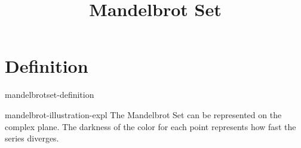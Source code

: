 \documentclass[preview]{standalone}
\begin{document}
\title{Mandelbrot Set}
\genpage

\section{Definition}

\begin{snippet}{mandelbrotset-definition}
\end{snippet}

\begin{snippet}{mandelbrot-illustration-expl}
The Mandelbrot Set can be represented on the complex plane.
The darkness of the color for each point
represents how fast the series diverges.
\end{snippet}

\end{document}
